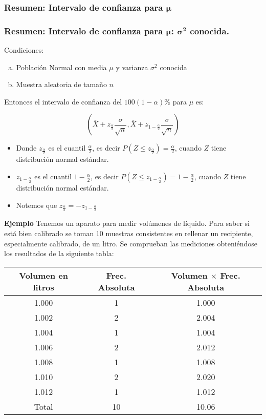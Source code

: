   \subsubsection{Resumen: Intervalo de confianza para $\mathbf{\mu}$}
  
\begin{frame}
    \frametitle{Resumen: Intervalo de confianza para $\mathbf{\mu}$:
    $\mathbf{\sigma^2}$ conocida.}
Condiciones:
    \begin{enumerate}[a)]
    \item Población Normal con media $\mu$ y varianza $\sigma^2$ conocida
    \item Muestra aleatoria de tamaño $n$
    \end{enumerate}
    Entonces el intervalo de confianza del $100(1-\alpha)\%$ para $\mu$
    es:

    $$\left( \overline{X}+z_{\frac{\alpha}{2}}\frac{\sigma}{\sqrt{n}},
    \overline{X}+z_{1-\frac{\alpha}{2}}\frac{\sigma}{\sqrt{n}}\right)$$
\begin{itemize}
\item Donde  $z_{\frac{\alpha}{2}}$ es el cuantil $\frac{\alpha}{2}$, es decir
    $P(Z\leq z_{\frac{\alpha}{2}})=\frac{\alpha}{2}$, cuando $Z$ tiene
    distribución normal estándar.
\item $z_{1-\frac{\alpha}{2}}$
    es el cuantil $1-\frac{\alpha}{2}$, es decir
    $P(Z\leq z_{1-\frac{\alpha}{2}})=1-\frac{\alpha}{2}$, cuando $Z$ tiene
    distribución normal estándar.
\item  Notemos que
    $z_{\frac{\alpha}{2}}=-z_{1-\frac{\alpha}{2}}$
\end{itemize}
\end{frame}

\begin{frame}
    \textbf{Ejemplo}
Tenemos un aparato para medir volúmenes de líquido. Para saber si está bien calibrado se toman 10 muestras consistentes en 
 rellenar un recipiente, especialmente calibrado, de un litro. Se comprueban las mediciones obteniéndose los resultados de la siguiente tabla:
\begin{center}
    \begin{tabular}{c|c|c}
        \hline
        Volumen en litros &  Frec. Absoluta & Volumen $\times$ Frec. Absoluta\\
        \hline
        1.000 & 1 & 1.000\\
        1.002 & 2 & 2.004\\
        1.004 & 1 & 1.004\\
        1.006 & 2 & 2.012\\
        1.008 & 1 & 1.008\\
        1.010 & 2 & 2.020\\
        1.012 & 1 & 1.012\\
       \hline\hline
       Total & 10 & 10.06
        \end{tabular}
        \end{center}

\end{frame}

